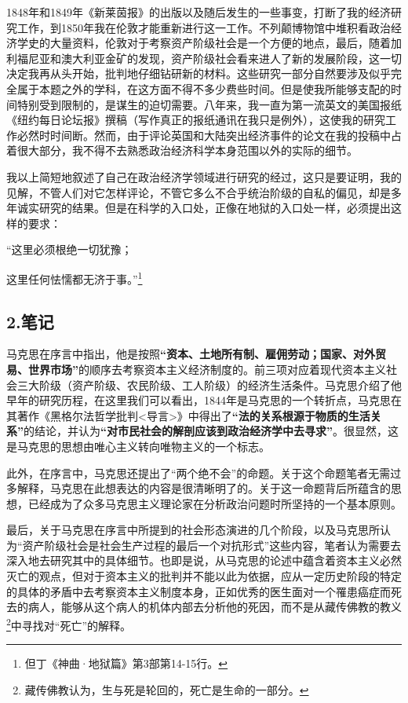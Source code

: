 \documentclass[a4paper,twoside,12pt]{ctexart}
\begin{document}
1848年和1849年《新莱茵报》的出版以及随后发生的一些事变，打断了我的经济研究工作，到1850年我在伦敦才能重新进行这一工作。不列颠博物馆中堆积看政治经济学史的大量资料，伦敦对于考察资产阶级社会是一个方便的地点，最后，随着加利福尼亚和澳大利亚金矿的发现，资产阶级社会看来进人了新的发展阶段，这一切决定我再从头开始，批判地仔细钻研新的材料。这些研究一部分自然要涉及似乎完全属于本题之外的学科，在这方面不得不多少费些时间。但是使我所能够支配的时间特别受到限制的，是谋生的迫切需要。八年来，我一直为第一流英文的美国报纸《纽约每日论坛报》撰稿（写作真正的报纸通讯在我只是例外），这使我的研究工作必然时时间断。然而，由于评论英国和大陆突出经济事件的论文在我的投稿中占着很大部分，我不得不去熟悉政治经济科学本身范围以外的实际的细节。

我以上简短地叙述了自己在政治经济学领域进行研究的经过，这只是要证明，我的见解，不管人们对它怎样评论，不管它多么不合乎统治阶级的自私的偏见，却是多年诚实研究的结果。但是在科学的入口处，正像在地狱的入口处一样，必须提出这样的要求：

\begin{fangsong}
“这里必须根绝一切犹豫；

这里任何怯懦都无济于事。”\footnote{但丁《神曲·地狱篇》第3部第14-15行。} 
\end{fangsong}
\newpage
\subsection{2.笔记}
马克思在序言中指出，他是按照\textbf{“资本、土地所有制、雇佣劳动；国家、对外贸易、世界市场”}的顺序去考察资本主义经济制度的。前三项对应着现代资本主义社会三大阶级（资产阶级、农民阶级、工人阶级）的经济生活条件。马克思介绍了他早年的研究历程，在这里我们可以看出，1844年是马克思的一个转折点，马克思在其著作《黑格尔法哲学批判<导言>》中得出了\textbf{“法的关系根源于物质的生活关系”}的结论，并认为\textbf{“对市民社会的解剖应该到政治经济学中去寻求”}。很显然，这是马克思的思想由唯心主义转向唯物主义的一个标志。

此外，在序言中，马克思还提出了“两个绝不会”的命题。关于这个命题笔者无需过多解释，马克思在此想表达的内容是很清晰明了的。关于这一命题背后所蕴含的思想，已经成为了众多马克思主义理论家在分析政治问题时所坚持的一个基本原则。

最后，关于马克思在序言中所提到的社会形态演进的几个阶段，以及马克思所认为“资产阶级社会是社会生产过程的最后一个对抗形式”这些内容，笔者认为需要去深入地去研究其中的具体细节。也即是说，从马克思的论述中蕴含着资本主义必然灭亡的观点，但对于资本主义的批判并不能以此为依据，应从一定历史阶段的特定的具体的矛盾中去考察资本主义制度本身，正如优秀的医生面对一个罹患癌症而死去的病人，能够从这个病人的机体内部去分析他的死因，而不是从藏传佛教的教义\footnote{藏传佛教认为，生与死是轮回的，死亡是生命的一部分。}中寻找对“死亡”的解释。
\end{document}
